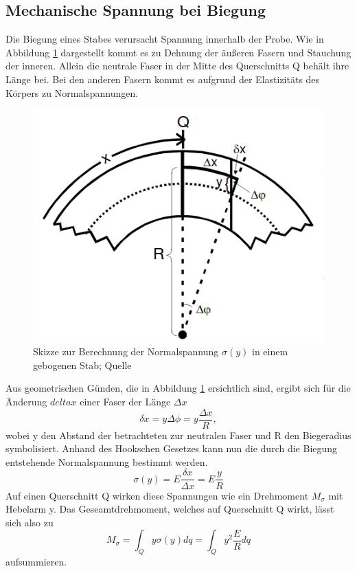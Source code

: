 \subsection{Mechanische Spannung bei Biegung}
    \label{sec:aiaiai}
    Die Biegung eines Stabes verursacht Spannung innerhalb der Probe. Wie in Abbildung \ref{fig:backfisch}
    dargestellt kommt es zu Dehnung der äußeren Fasern und Stauchung der inneren. 
    Allein die neutrale Faser in der Mitte des Querschnitts Q behält ihre Länge bei.
    Bei den anderen Fasern kommt es aufgrund der Elastizitäts des Körpers zu Normalspannungen.
    \begin{figure}
        \centering
        \includegraphics[scale=0.5]{Backfisch.png}
        \caption{Skizze zur Berechnung der Normalspannung $\sigma(y)$ in einem gebogenen Stab; Quelle \cite{sample}}
        \label{fig:backfisch}
    \end{figure}
    Aus geometrischen Günden, die in Abbildung \ref{fig:backfisch} ersichtlich sind, 
    ergibt sich für die Änderung $delta x$ einer Faser der Länge $\Delta x$
    \begin{equation*}
        \delta x = y \Delta \phi= y\dfrac{\Delta x}{R},
    \end{equation*}
    wobei y den Abstand der betrachteten zur neutralen Faser und R den Biegeradius
    symbolisiert. Anhand des Hookschen Gesetzes kann nun die durch die Biegung 
    entstehende Normalspannung bestimmt werden.
    \begin{equation*}
        \sigma(y)=E\dfrac{\delta x}{\Delta x}=E \dfrac{y}{R}
    \end{equation*}
    Auf einen Querschnitt Q wirken diese Spannungen wie ein Drehmoment $M_{\sigma}$ mit
    Hebelarm y. Das Geseamtdrehmoment, welches auf Querschnitt Q wirkt, lässt sich also 
    zu
    \begin{equation}
        \label{eqn:fuckyou}
        M_{\sigma}=\int_Q y \sigma(y)dq = \int_Q y^2 \dfrac{E}{R}dq 
    \end{equation}
    aufsummieren. 
    
